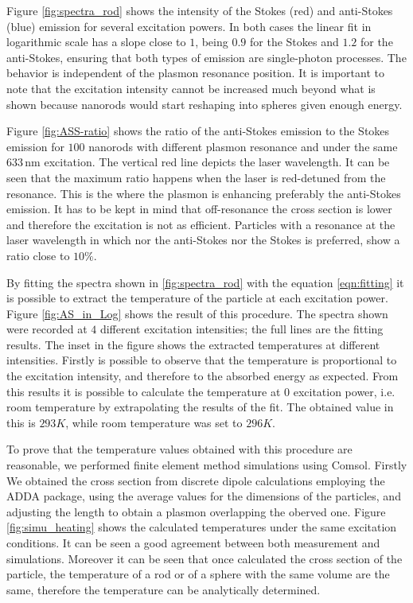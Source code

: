\documentclass[journal=nalefd,manuscript=letter]{achemso}
\newcommand{\nm}{\ensuremath{\,\textrm{nm}}}
\begin{document}
Figure \ref{fig:spectra_rod} shows the intensity of the Stokes (red) and
anti-Stokes (blue) emission for several excitation powers. In both cases the
linear fit in logarithmic scale has a slope close to $1$, being $0.9$ for the
Stokes and $1.2$ for the anti-Stokes, ensuring that both types of emission are
single-photon processes. The behavior is independent of the plasmon resonance
position. It is important to note that the excitation intensity cannot be
increased much beyond what is shown because nanorods would start reshaping into
spheres given enough energy.

Figure \ref{fig:ASS-ratio} shows the ratio of the anti-Stokes emission to the
Stokes emission for $100$ nanorods with different plasmon resonance and under
the same $633\nm$ excitation. The vertical red line depicts the laser
wavelength. It can be seen that the maximum ratio happens when the laser is
red-detuned from the resonance. This is the where the plasmon is
enhancing preferably the anti-Stokes emission. It has to be kept in mind that
off-resonance the cross section is lower and therefore the excitation is not as
efficient. Particles with a resonance at the laser wavelength in which nor the
anti-Stokes nor the Stokes is preferred, show a ratio close to $10\%$.

By fitting the spectra shown in \ref{fig:spectra_rod} with the equation
\ref{eqn:fitting} it is possible to extract the temperature of the particle at
each excitation power. Figure \ref{fig:AS_in_Log} shows the result of this
procedure. The spectra shown were recorded at $4$ different excitation
intensities; the full lines are the fitting results. The inset in the figure
shows the extracted temperatures at different intensities. Firstly is
possible to observe that the temperature is proportional to the excitation
intensity, and therefore to the absorbed energy as expected. From this results
it is possible to calculate the temperature at $0$ excitation power, i.e.
room temperature by extrapolating the results of the fit. The obtained value
in this is $293K$, while room temperature was set to $296K$. 

To prove that the temperature values obtained with this procedure are
reasonable, we performed finite element method simulations using Comsol.
Firstly We obtained the cross section from discrete dipole calculations
employing the ADDA package, using the average values for the dimensions of the
particles, and adjusting the length to obtain a plasmon overlapping the oberved
one. Figure \ref{fig:simu_heating} shows the calculated temperatures under the
same excitation conditions. It can be seen a good agreement between both
measurement and simulations. Moreover it can be seen that once calculated the
cross section of the particle, the temperature of a rod or of a sphere with the
same volume are the same, therefore the temperature can be analytically
determined.
\end{document}
